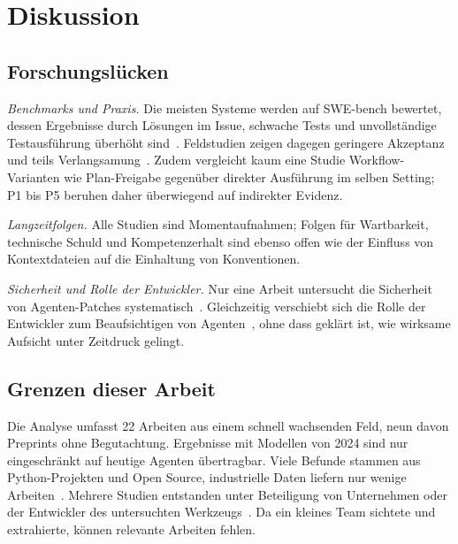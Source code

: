 \section{Diskussion}
\label{sec:diskussion}

\subsection{Forschungslücken}
\textit{Benchmarks und Praxis.} Die meisten Systeme werden auf SWE-bench bewertet, dessen Ergebnisse durch Lösungen im Issue, schwache Tests und unvollständige Testausführung überhöht sind~\cite{aleithan2024swebenchplus,wang2026solvedissues}. Feldstudien zeigen dagegen geringere Akzeptanz~\cite{li2025aidev} und teils Verlangsamung~\cite{becker2025metr}. Zudem vergleicht kaum eine Studie Workflow-Varianten wie Plan-Freigabe gegenüber direkter Ausführung im selben Setting; P1 bis P5 beruhen daher überwiegend auf indirekter Evidenz.

\textit{Langzeitfolgen.} Alle Studien sind Momentaufnahmen; Folgen für Wartbarkeit, technische Schuld und Kompetenzerhalt sind ebenso offen wie der Einfluss von Kontextdateien auf die Einhaltung von Konventionen.

\textit{Sicherheit und Rolle der Entwickler.} Nur eine Arbeit untersucht die Sicherheit von Agenten-Patches systematisch~\cite{sajadi2025patchsecurity}. Gleichzeitig verschiebt sich die Rolle der Entwickler zum Beaufsichtigen von Agenten~\cite{dhanorkar2026oversight}, ohne dass geklärt ist, wie wirksame Aufsicht unter Zeitdruck gelingt.

\subsection{Grenzen dieser Arbeit}
Die Analyse umfasst 22 Arbeiten aus einem schnell wachsenden Feld, neun davon Preprints ohne Begutachtung. Ergebnisse mit Modellen von 2024 sind nur eingeschränkt auf heutige Agenten übertragbar. Viele Befunde stammen aus Python-Projekten und Open Source, industrielle Daten liefern nur wenige Arbeiten~\cite{takerngsaksiri2025hula,cui2025genai,dhanorkar2026oversight}. Mehrere Studien entstanden unter Beteiligung von Unternehmen oder der Entwickler des untersuchten Werkzeugs~\cite{chen2025codewithme,takerngsaksiri2025hula,dhanorkar2026oversight}. Da ein kleines Team sichtete und extrahierte, können relevante Arbeiten fehlen.
